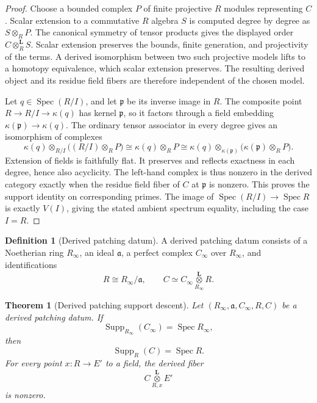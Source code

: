 \documentclass[11pt]{amsart}
\newtheorem{theorem}{Theorem}[section]
\theoremstyle{definition}
\newtheorem{definition}[definition]{Definition}
\theoremstyle{remark}
\newcommand{\Spec}{\operatorname{Spec}}
\newcommand{\Supp}{\operatorname{Supp}}
\newcommand{\frakp}{\mathfrak p}
\newcommand{\fraka}{\mathfrak a}
\begin{document}
\begin{proof}
Choose a bounded complex \(P\) of finite projective \(R\) modules representing \(C\). Scalar extension to a commutative \(R\) algebra \(S\) is computed degree by degree as \(S\otimes_RP\). The canonical symmetry of tensor products gives the displayed order \(C\otimes_R^{\mathbf L}S\). Scalar extension preserves the bounds, finite generation, and projectivity of the terms. A derived isomorphism between two such projective models lifts to a homotopy equivalence, which scalar extension preserves. The resulting derived object and its residue field fibers are therefore independent of the chosen model.

Let \(q\in\Spec(R/I)\), and let \(\frakp\) be its inverse image in \(R\). The composite point \(R\to R/I\to\kappa(q)\) has kernel \(\frakp\), so it factors through a field embedding \(\kappa(\frakp)\to\kappa(q)\). The ordinary tensor associator in every degree gives an isomorphism of complexes
\[
\kappa(q)\otimes_{R/I}\bigl((R/I)\otimes_RP\bigr)
\cong\kappa(q)\otimes_RP
\cong\kappa(q)\otimes_{\kappa(\frakp)}
\bigl(\kappa(\frakp)\otimes_RP\bigr).
\]
Extension of fields is faithfully flat. It preserves and reflects exactness in each degree, hence also acyclicity. The left-hand complex is thus nonzero in the derived category exactly when the residue field fiber of \(C\) at \(\frakp\) is nonzero. This proves the support identity on corresponding primes. The image of \(\Spec(R/I)\to\Spec R\) is exactly \(V(I)\), giving the stated ambient spectrum equality, including the case \(I=R\).
\end{proof}

\begin{definition}[Derived patching datum]\label{def:derived_patching_datum}
A derived patching datum consists of a Noetherian ring \(R_\infty\), an ideal
\(\fraka\), a perfect complex \(C_\infty\) over \(R_\infty\), and identifications
\[
R\cong R_\infty/\fraka,
\qquad
C\simeq
C_\infty
\mathbin{\mathop{\otimes}\limits_{R_\infty}^{\mathbf L}}R.
\]
\end{definition}

\begin{theorem}[Derived patching support descent]\label{thm:derived_support_descent}
Let \((R_\infty,\fraka,C_\infty,R,C)\) be a derived patching datum. If
\[
\Supp_{R_\infty}(C_\infty)=\Spec R_\infty,
\]
then
\[
\boxed{
\Supp_R(C)=\Spec R.
}
\]
For every point \(x:R\to E'\) to a field, the derived fiber
\[
C\mathbin{\mathop{\otimes}\limits_{R,x}^{\mathbf L}}E'
\]
is nonzero.
\end{theorem}
\end{document}
